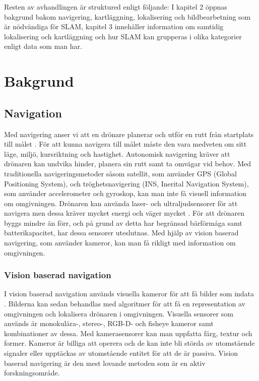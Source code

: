 Resten av avhandlingen är struktured enligt följande: I kapitel 2 öppnas bakgrund bakom navigering, kartläggning, lokalisering och bildbearbetning som är nödvändiga för SLAM, kapitel 3 innehåller information om samtidig lokalisering och kartläggning och hur SLAM kan grupperas i olika kategorier enligt data som man har.

\chapter{Bakgrund}

\section{Navigation}

Med navigering anser vi att en drönare planerar och utför en rutt från startplats till målet \citep{geospatial}. För att kunna navigera till målet måste den vara medveten om sitt läge, miljö, kursriktning och hastighet. Autonomisk navigering kräver att drönaren kan undvika hinder, planera sin rutt samt ta omvägar vid behov. Med traditionella navigeringsmetoder såsom satellit, som använder GPS (Global Positioning System), och tröghetsnavigering (INS, Inerital Navigation System), som använder accelerometer och gyroskop, kan man inte få visuell information om omgivningen. Drönaren kan använda laser- och ultraljudsensorer för att navigera men dessa kräver mycket energi och väger mycket \citep{6385934}. För att drönaren byggs mindre än förr, och på grund av detta har begränsad bärförmåga samt batterikapacitet, har dessa sensorer uteslutnas. Med hjälp av vision baserad navigering, som använder kameror, kan man få rikligt med information om omgivningen. 

\subsection{Vision baserad navigation}

I vision baserad navigation används visuella kameror för att få bilder som indata \citep{geospatial}. Bilderna kan sedan behandlas med algoritmer för att få en representation av omgivningen och lokalisera drönaren i omgivningen. Visuella sensorer som används är monokulära-, stereo-, RGB-D- och fisheye kameror samt kombinationer av dessa. Med kamerasensorer kan man uppfatta färg, textur och former. Kameror är billiga att operera och de kan inte bli störda av utomstående signaler eller upptäckas av utomstående entitet för att de är passiva. Vision baserad navigering är den mest lovande metoden som är en aktiv forskningsområde.

